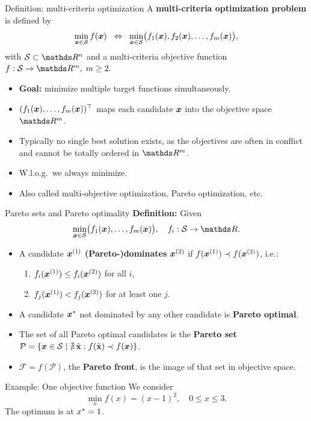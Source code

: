 \documentclass[11pt,compress,t,notes=noshow,xcolor=table]{beamer}
\begin{document}
\begin{framev}{Definition: multi-criteria optimization}
A \textbf{multi-criteria optimization problem} is defined by
$$
\min_{\bm{x} \in \mathcal{S}}  f(\bm{x})
\;\;\Leftrightarrow\;\;
\min_{\bm{x} \in \mathcal{S}}
\bigl(f_1(\bm{x}), f_2(\bm{x}), \dots, f_m(\bm{x})\bigr),
$$
with $\S \subset \R^n$ and a multi-criteria objective function
$f: \S \to \R^m,\; m \ge 2.$
\begin{itemize}
\item \textbf{Goal:} minimize multiple target functions simultaneously.
\item $(f_1(\bm{x}), \dots, f_m(\bm{x}))^\top$ maps each candidate
$\bm{x}$ into the objective space $\R^m$.
\item Typically no single best solution exists, as the objectives are often
in conflict and cannot be totally ordered in $\R^m$.
\item W.l.o.g.\ we always minimize.
\item Also called multi-objective optimization, Pareto optimization, etc.
\end{itemize}
\end{framev}


\begin{framev}{Pareto sets and Pareto optimality}
\textbf{Definition:}
Given
$$
\min_{\xv \in \S}
\bigl(f_1(\xv), \dots, f_m(\xv)\bigr),
\quad f_i: \S \to \R.
$$
\begin{itemize}
\item A candidate $\bm{x}^{(1)}$ \textbf{(Pareto-)dominates} $\bm{x}^{(2)}$
if $f(\bm{x}^{(1)}) \prec f(\bm{x}^{(2)})$, i.e.:
\begin{enumerate}
\item $f_i(\bm{x}^{(1)}) \le f_i(\bm{x}^{(2)})$ for all $i$,
\item $f_j(\bm{x}^{(1)}) < f_j(\bm{x}^{(2)})$ for at least one $j$.
\end{enumerate}
\item A candidate $\bm{x}^{\ast}$ not dominated by any other candidate is
\textbf{Pareto optimal}.
\item The set of all Pareto optimal candidates is the \textbf{Pareto set}
$\mathcal{P} = \{\bm{x} \in \mathcal{S} \mid \nexists \,\tilde{\mathbf{x}} :
  f(\tilde{\mathbf{x}}) \prec f(\bm{x})\}$.
\item $\mathcal{F} = f(\mathcal{P})$, the \textbf{Pareto front},
is the image of that set in objective space.
\end{itemize}
\end{framev}

\begin{framev}{Example: One objective function}
We consider
$$
\min_{x} f(x) = (x - 1)^2,
\quad 0 \le x \le 3.
$$
The optimum is at $x^\ast = 1$.
\end{framev}
\end{document}

